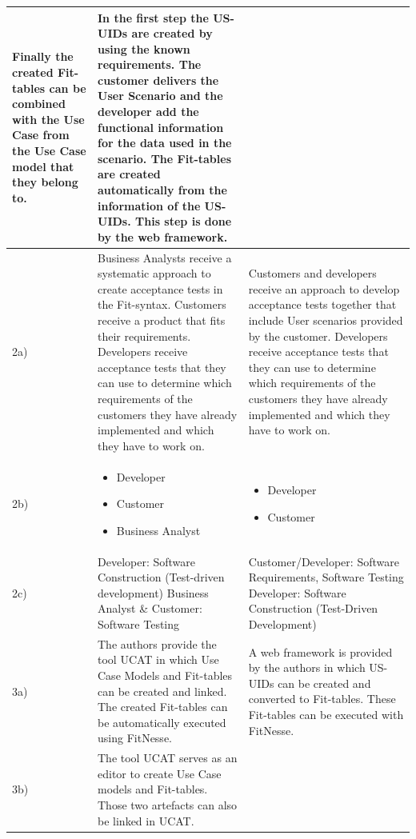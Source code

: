 \begin{small}
\begin{longtable}[h]{p{0.45cm}|p{}|p{}}
Finally the created Fit-tables can be combined with the Use Case from the Use Case model that they belong to.
 & In the first step the US-UIDs are created by using the known requirements.
The customer delivers the User Scenario and the developer add the functional information for the data used in the scenario.
The Fit-tables are created automatically from the information of the US-UIDs. This step is done by the web framework.\\
\hline
  2a) & Business Analysts receive a systematic approach to create acceptance tests in the Fit-syntax.
Customers receive a product that fits their requirements.
Developers receive acceptance tests that they can use to determine which requirements of the customers they have already implemented and which they have to work on.
 & Customers and developers receive an approach to develop acceptance tests together that include User scenarios provided by the customer.
Developers receive acceptance tests that they can use to determine which requirements of the customers they have already implemented and which they have to work on.
 \\
  \hline
  		 2b) & 
  		 	\begin{itemize}
  		 		\item Developer 
  		 		\item Customer 
  		 		\item  Business Analyst
			\end{itemize}  		 
			& \begin{itemize}
  		 		\item Developer 
  		 		\item Customer
				\end{itemize}\\
	 \hline
  		 2c) & Developer: Software Construction (Test-driven development) \newline
Business Analyst \& Customer: Software Testing
 & Customer/Developer: Software Requirements, Software Testing \newline
Developer: Software Construction (Test-Driven Development)
 \\
  		\hline
  		 3a) & The authors provide the tool UCAT in which Use Case Models and Fit-tables can be created and linked. The created Fit-tables can be automatically executed using FitNesse. & A web framework is provided by the authors in which US-UIDs can be created and converted to Fit-tables. These Fit-tables can be executed with FitNesse. \\
  	 \hline
  		 3b) & The tool UCAT serves as an editor to create Use Case models and Fit-tables. Those two artefacts can also be linked in UCAT.

\end{longtable}
\end{small}
